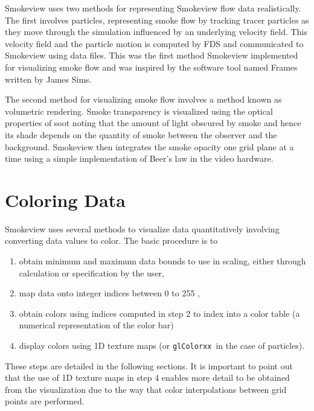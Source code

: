 \documentclass[11pt,twoside]{book}
\begin{document}
Smokeview uses two methods for representing Smokeview flow data
realistically.  The first involves particles, representing smoke
flow by tracking tracer particles as they move through the
simulation influenced by an underlying  velocity field.  This
velocity field and the particle motion is computed by FDS and
communicated to Smokeview using data files.  This was the first
method Smokeview implemented for visualizing smoke flow and was
inspired by the software tool named Frames written by James Sims.

The second method for visualizing smoke flow involves a method
known as volumetric rendering.  Smoke transparency is visualized
using the optical properties of soot noting that the amount
of light obscured by smoke and hence its shade depends on
the quantity of smoke between the observer and the background.
Smokeview then integrates the smoke opacity one grid plane at a
time using a simple implementation of Beer's law in the video
hardware.



%
%

\section{Coloring Data}
Smokeview uses several methods to visualize data quantitatively
involving converting data values to color. The basic procedure is
to
\begin{enumerate}
\item obtain minimum and maximum data bounds to use in scaling,
either through calculation or specification by the user,

\item map data onto integer indices between 0 to 255 ,

\item obtain colors using indices computed in step 2 to index into
a color table (a numerical representation of the color bar)

\item display colors using 1D texture maps (or {\tt glColorxx}\ in
the case of particles).
\end{enumerate}
These steps are detailed in the following sections.   It is
important to point out that the use of 1D texture maps in step 4
enables more detail to be obtained from the visualization due to
the way that color interpolations between grid points are
performed.
\end{document}
